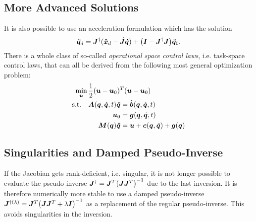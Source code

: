 		\subsection{More Advanced Solutions}
			It is also possible to use an acceleration formulation which has the solution
			\begin{equation*}
				\ddot{\bm{q}}_d = \bm{J}^\dagger ( \ddot{\bm{x}}_d - \dot{\bm{J}} \dot{\bm{q}} ) + \big( \bm{I} - \bm{J}^\dagger \bm{J} \big) \ddot{\bm{q}}_0.
			\end{equation*}
			There is a whole class of so-called \emph{operational space control laws}, i.e. task-space control laws, that can all be derived from the following most general optimization problem:
			\begin{equation*}
				\begin{aligned}
					\min_{\bm{u}} \,   & \frac{1}{2} (\bm{u} - \bm{u}_0)^T (\bm{u} - \bm{u}_0) \\
					\mathrm{s.t.} \quad &
					\begin{aligned}[t]
						\bm{A}(\bm{q}, \dot{\bm{q}}, t) \ddot{\bm{q}} & = \dot{\bm{b}}(\bm{q}, \dot{\bm{q}}, t)                     \\
						\bm{u}_0                                         & = \bm{g}(\bm{q}, \dot{\bm{q}}, t)                           \\
						\bm{M}(\bm{q}) \ddot{\bm{q}}                   & = \bm{u} + \bm{c}(\bm{q}, \dot{\bm{q}}) + \bm{g}(\bm{q})
					\end{aligned}
				\end{aligned}
			\end{equation*}

		\subsection{Singularities and Damped Pseudo-Inverse}
			If the Jacobian gets rank-deficient, i.e. singular, it is not longer possible to evaluate the pseudo-inverse \( \bm{J}^\dagger = \bm{J}^T \big( \bm{J} \bm{J}^T \big)^{-1} \) due to the last inversion. It is therefore numerically more stable to use a damped pseudo-inverse \( \bm{J}^{\dagger(\lambda)} = \bm{J}^T \big( \bm{J} \bm{J}^T + \lambda \bm{I} \big)^{-1} \) as a replacement of the regular pseudo-inverse. This avoids singularities in the inversion.

